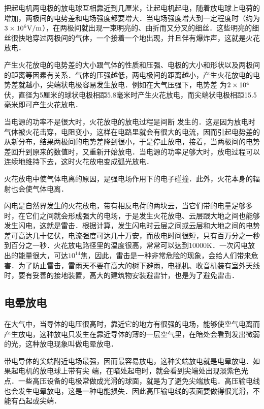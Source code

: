 把起电机两电极的放电球互相靠近到几厘米，让起电机起电，随着放电球上电荷的增加，两极间的电势差和电场强度都要增大．当电场强度增大到一定程度时（约为$3\times10^6{\rm V}/{\rm m}$），在两极间就出现一束明亮的、曲折而又分叉的细丝．这些明亮的细丝很快地穿过两极间的气体，一个接着一个地出现，并且伴有爆炸声，这就是火花放电．

产生火花放电的电势差的大小跟气体的性质和压强、电极的大小和形状以及两极间的距离等因素有关系．气体的压强越低，两电极间的距离越小，产生火花放电的电势差就越小，尖端状电极容易发生放电．例如在大气压强下，电势差
为$2\times10^4$伏，直径为5厘米的球状电极相距5.8毫米时产生火花放电，而尖端状电极相距15.5毫米即可产生火花放电．

当电源的功率不是很大时，火花放电的放电过程是间断
发生的．这是因为放电时气体被火花击穿，电阻变小，这样在电路里就会有很大的电流，因而引起电势差的从新分布，结果两极间的电势差降到很小，于是停止放电，接着，当两极间的电势差回升到原来的数值时，又重新开始放电．当电源的功率足够大时，放电过程可以连续地维持下去，这时火花放电变成弧光放电．

火花放电中使气体电离的原因，是强电场作用下的电子碰撞．此外，火花本身的辐射也会使气体电离．

闪电是自然界发生的火花放电，带有相反电荷的两块云，当它们带的电量足够多时，在它们之间就会形成强大的电场，于是发生火花放电、云层跟大地之间也能够发生闪电，这就是雷击．根据计算，发生闪电时云层之间或云层和大地之间的电势差可高达几十亿伏，电流强度可达几十万安，而放电时间很短，只有百万分之一秒到百分之一秒．火花放电路径里的温度很高，常常可以达到10000K．一次闪电放出的能量很大，可达$10^{14}$焦，因此，雷击是一种非常危险的现象，会给人们带来危害．为了防止雷击，雷雨天不要在高大的树下避雨，电视机、收音机装有室外天线时，要有妥善的接地装置，高大的建筑物安装避雷针，也是为了避免雷击．

\subsection{电晕放电}


在大气中，当导体的电压很高时，靠近它的地方有很强的电场，能够使空气电离而产生放电，这种放电只发生在靠近导体的薄的一层空气里，在暗处会看到发出微弱的光，这种放电现象叫做电晕放电．

带电导体的尖端附近电场最强，因而最容易放电，这种尖端放电就是电晕放电．如果起电机的放电球上带有尖
端，在暗处起电时，就会看到尖端处出现淡紫色光点．一些高压设备的电极常做成光滑的球面，就是为了避免尖端放电．高压输电线也会发生电晕放电，这是一种电能损失．因此高压输电线的表面要做得很光滑，不能有凸起或尖端．

